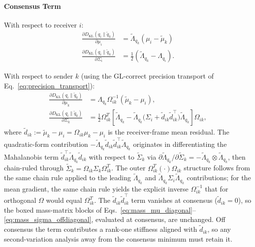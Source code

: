 \documentclass[11pt]{article}
\begin{document}
\paragraph{Consensus Term}

With respect to receiver $i$:
\begin{align}
\frac{\partial D_{\mathrm{KL}}(q_i \| \tilde{q}_k)}{\partial \mu_i} &= \tilde{\Lambda}_{q_k}(\mu_i - \tilde{\mu}_k) \\
\frac{\partial D_{\mathrm{KL}}(q_i \| \tilde{q}_k)}{\partial \Sigma_i} &= \frac{1}{2}(\tilde{\Lambda}_{q_k} - \Lambda_{q_i}).
\end{align}

With respect to sender $k$ (using the GL-correct precision transport of Eq.~\eqref{eq:precision_transport}):
\begin{align}
\frac{\partial D_{\mathrm{KL}}(q_i \| \tilde{q}_k)}{\partial \mu_k} &= \Lambda_{q_k}\Omega_{ik}^{-1}(\tilde{\mu}_k - \mu_i), \\
\frac{\partial D_{\mathrm{KL}}(q_i \| \tilde{q}_k)}{\partial \Sigma_k} &= \frac{1}{2}\Omega_{ik}^T\left[\tilde{\Lambda}_{q_k} - \tilde{\Lambda}_{q_k}\big(\Sigma_i + \tilde{d}_{ik}\tilde{d}_{ik}^\top\big)\tilde{\Lambda}_{q_k}\right]\Omega_{ik},
\end{align}
where $\tilde{d}_{ik} := \tilde{\mu}_k - \mu_i = \Omega_{ik}\mu_k - \mu_i$ is the receiver-frame mean residual. The quadratic-form contribution $-\tilde{\Lambda}_{q_k}\tilde{d}_{ik}\tilde{d}_{ik}^\top\tilde{\Lambda}_{q_k}$ originates in differentiating the Mahalanobis term $\tilde{d}_{ik}^\top \tilde{\Lambda}_{q_k}\tilde{d}_{ik}$ with respect to $\tilde{\Sigma}_k$ via $\partial \tilde{\Lambda}_{q_k}/\partial \tilde{\Sigma}_k = -\tilde{\Lambda}_{q_k}\otimes\tilde{\Lambda}_{q_k}$, then chain-ruled through $\tilde{\Sigma}_k = \Omega_{ik}\Sigma_k\Omega_{ik}^T$. The outer $\Omega_{ik}^T(\cdot)\Omega_{ik}$ structure follows from the same chain rule applied to the leading $\tilde{\Lambda}_{q_k}$ and $\tilde{\Lambda}_{q_k}\Sigma_i\tilde{\Lambda}_{q_k}$ contributions; for the mean gradient, the same chain rule yields the explicit inverse $\Omega_{ik}^{-1}$ that for orthogonal $\Omega$ would equal $\Omega_{ik}^T$. The $\tilde{d}_{ik}\tilde{d}_{ik}^\top$ term vanishes at consensus ($\tilde{d}_{ik} = 0$), so the boxed mass-matrix blocks of Eqs.~\eqref{eq:mass_mu_diagonal}--\eqref{eq:mass_sigma_offdiagonal}, evaluated at consensus, are unchanged. Off consensus the term contributes a rank-one stiffness aligned with $\tilde{d}_{ik}$, so any second-variation analysis away from the consensus minimum must retain it.
\end{document}
